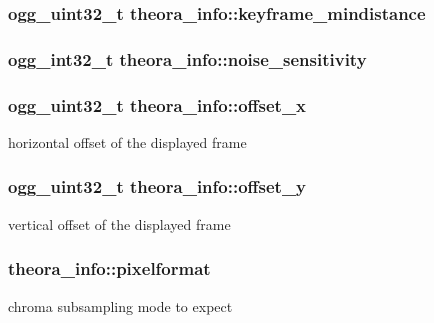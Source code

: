 \subsubsection[{keyframe\_\-mindistance}]{\setlength{\rightskip}{0pt plus 5cm}ogg\_\-uint32\_\-t {\bf theora\_\-info::keyframe\_\-mindistance}}\label{structtheora__info_aa79ca8c0e77a884d4487fd627fae32e9}
\subsubsection[{noise\_\-sensitivity}]{\setlength{\rightskip}{0pt plus 5cm}ogg\_\-int32\_\-t {\bf theora\_\-info::noise\_\-sensitivity}}\label{structtheora__info_ac4789034f547b57d1075e035050eeed9}
\subsubsection[{offset\_\-x}]{\setlength{\rightskip}{0pt plus 5cm}ogg\_\-uint32\_\-t {\bf theora\_\-info::offset\_\-x}}\label{structtheora__info_af5949a02bef29512f2705e6f6c944e3b}


horizontal offset of the displayed frame 
\subsubsection[{offset\_\-y}]{\setlength{\rightskip}{0pt plus 5cm}ogg\_\-uint32\_\-t {\bf theora\_\-info::offset\_\-y}}\label{structtheora__info_a91c3922097ba32a85acd584a01dc2c93}


vertical offset of the displayed frame 
\subsubsection[{pixelformat}]{ {\bf theora\_\-info::pixelformat}}\label{structtheora__info_a65ab4376ab5242ee82e06c78fb7008ab}


chroma subsampling mode to expect 
